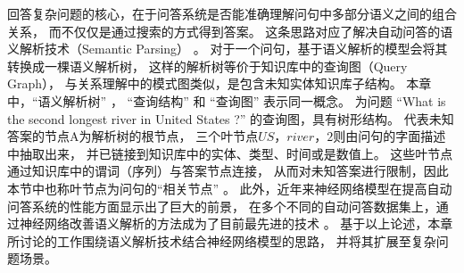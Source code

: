 回答复杂问题的核心，在于问答系统是否能准确理解问句中多部分语义之间的组合关系，
而不仅仅是通过搜索的方式得到答案。
这条思路对应了解决自动问答的语义解析技术（Semantic Parsing）
\cite{kwiatkowski2013scaling,berant2013semantic}。
对于一个问句，基于语义解析的模型会将其转换成一棵语义解析树，
这样的解析树等价于知识库中的查询图（Query Graph），
与关系理解中的模式图类似，是包含未知实体知识库子结构。
本章中，``{语义解析树}'' ， ``{查询结构}'' 和 ``{查询图}'' 表示同一概念。
为问题
``What is the second longest river in United States ?'' 的查询图，具有树形结构。
代表未知答案的节点A为解析树的根节点，
三个叶节点$US$，$river$，$2$则由问句的字面描述中抽取出来，
并已链接到知识库中的实体、类型、时间或是数值上。
这些叶节点通过知识库中的谓词（序列）与答案节点连接，
从而对未知答案进行限制，因此本节中也称叶节点为问句的``{相关节点}'' 。
此外，近年来神经网络模型在提高自动问答系统的性能方面显示出了巨大的前景，
在多个不同的自动问答数据集上，通过神经网络改善语义解析的方法成为了目前最先进的技术
\cite{yih2015semantic,bao2016constraint,xu2016question}。
基于以上论述，本章所讨论的工作围绕语义解析技术结合神经网络模型的思路，
并将其扩展至复杂问题场景。





